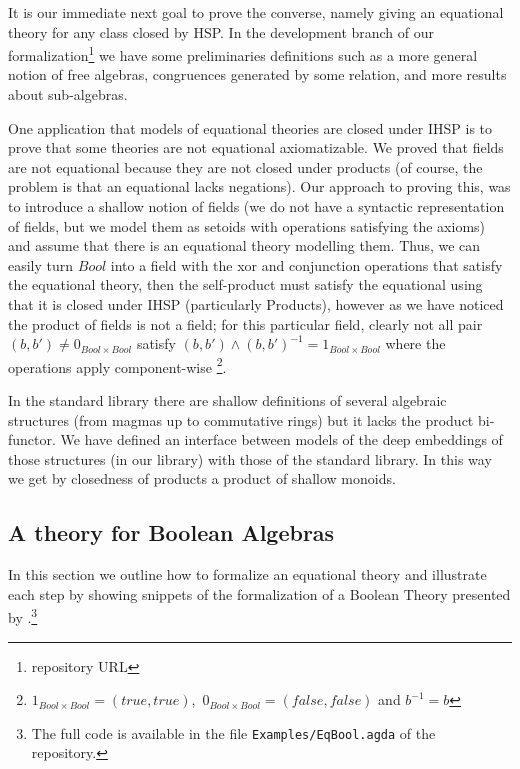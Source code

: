 
It is our immediate next goal to prove the converse, namely giving an
equational theory for any class closed by HSP. In the development
branch of our formalization\footnote{repository URL} we have some
preliminaries definitions such as a more general notion of free
algebras, congruences generated by some relation, and more results
about sub-algebras.

One application that models of equational theories are closed under
IHSP is to prove that some theories are not equational
axiomatizable. We proved that fields are not equational because they
are not closed under products (of course, the problem is that an
equational lacks negations). Our approach to proving this, was to
introduce a shallow notion of fields (\ie we do not have a syntactic
representation of fields, but we model them as setoids with operations
satisfying the axioms) and assume that there is an equational theory
modelling them. Thus, we can easily turn $\mathit{Bool}$ into a field with
the xor and conjunction operations that satisfy the equational theory,
then the self-product must satisfy the equational using that it is closed under
IHSP (particularly Products), however as we have noticed the product of fields
is not a field; for this particular field, clearly not all pair
$(b,b') \neq 0_{\mathit{Bool} \times \mathit{Bool}}$
satisfy $(b,b') \wedge (b,b')^{-1} = 1_{\mathit{Bool} \times \mathit{Bool}}$ where
the operations apply component-wise
\footnote{$1_{\mathit{Bool} \times \mathit{Bool}} = (true, true)$,\,
  $0_{\mathit{Bool} \times \mathit{Bool}} = (false, false)$ and $b^{-1} = b$}.

In the standard library there are shallow definitions of several
algebraic structures (from magmas up to commutative rings) but it
lacks the product bi-functor. We have defined an interface between
models of the deep embeddings of those structures (in our library)
with those of the standard library. In this way we get by closedness
of products a product of shallow monoids.

\subsection{A theory for Boolean Algebras }\label{sec:eqlog-theory-ol}
In this section we outline
how to formalize an equational theory and illustrate each step by
showing snippets of the formalization of a Boolean Theory presented by
\cite{DBLP:conf/RelMiCS/RochaM08}.\footnote{The full code is available
  in the file \nolinkurl{Examples/EqBool.agda} of the repository.}


